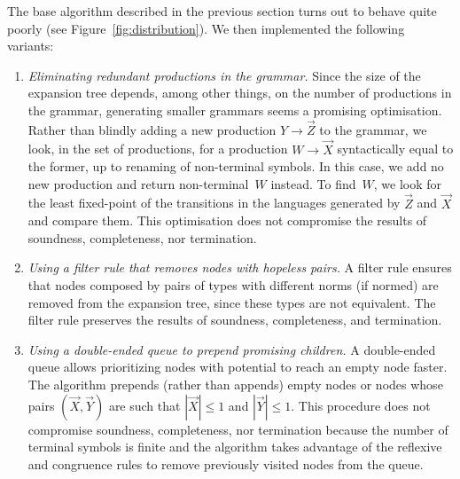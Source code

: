 The base algorithm described in the previous section turns out to
behave quite poorly (see Figure~\ref{fig:distribution}). We then implemented the
following variants:
%
\begin{enumerate}
\item \emph{Eliminating redundant productions in the grammar.}  Since
  the size of the expansion tree depends, among other things, on the
  number of productions in the grammar, generating smaller grammars
  seems a promising optimisation. Rather than blindly adding a new
  production $Y \rightarrow \vec Z$ to the grammar, we look, in the
  set of productions, for a production $W \rightarrow \vec X$
  syntactically equal to the former, up to renaming of non-terminal
  symbols.  In this case, we add no new production and return
  non-terminal~$W$ instead. To find~$W$, we look for the least
  fixed-point of the transitions in the languages generated by
  $\vec Z$ and $\vec X$ and compare them.  This optimisation does not
  compromise the results of soundness, completeness, nor termination.
  \item
  \emph{Using a filter rule that removes nodes with hopeless pairs.} A
  filter rule ensures that nodes composed by pairs of types with
  different norms (if normed) are removed from the expansion tree,
  since these types are not equivalent.  
  The filter rule
  preserves the results of soundness, completeness, and termination.
  \item
  \emph{Using a double-ended queue to prepend promising children.} A
  double-ended queue allows prioritizing nodes with potential to reach
  an empty node faster.  The algorithm prepends (rather than appends)
  empty nodes or nodes whose pairs $(\vec X, \vec Y)$ are such that
  $|\vec X|\leq 1$ and $|\vec Y| \leq 1$.
  This procedure does not compromise soundness, completeness, nor
  termination because the number of terminal symbols is finite and the 
  algorithm takes advantage of the reflexive and congruence 
  rules to remove previously visited nodes from the queue.
\end{enumerate}

